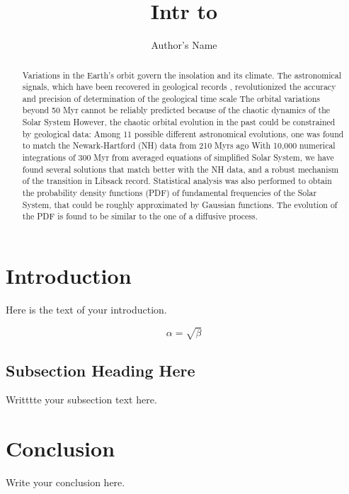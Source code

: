 \documentclass{article}
\begin{document}
\title{Intr to }


\author{Author's Name}

\maketitle

\begin{abstract}
    Variations in the Earth's orbit govern the insolation and its climate. The astronomical signals, which have been recovered in geological records , revolutionized the accuracy and precision of determination of the geological time scale 
    The orbital variations beyond 50 Myr cannot be reliably predicted because of the chaotic dynamics of the Solar System 
    However, the chaotic orbital evolution in the past could be constrained by geological data: Among 11 possible different astronomical evolutions, one was found to match the Newark-Hartford (NH) data from 210 Myrs ago 
    With 10,000 numerical integrations of 300 Myr from averaged equations of simplified Solar System, we have found several solutions that match better with the NH data, and a robust mechanism of the transition in Libsack record.
    Statistical analysis was also performed to obtain the probability density functions (PDF) of fundamental frequencies of the Solar System, that could be roughly approximated by Gaussian functions. The evolution of the PDF is found to be similar to the one of a diffusive process.


\end{abstract}



\section{Introduction}
Here is the text of your introduction.

\begin{equation}
    \label{simple_equation}
    \alpha = \sqrt{ \beta }
\end{equation}

\subsection{Subsection Heading Here}
Writttte your subsection text here.

\section{Conclusion}
Write your conclusion here.
\end{document}
